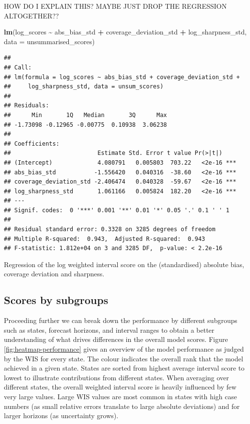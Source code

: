 \documentclass[
]{book}
\newenvironment{Shaded}{\begin{snugshade}}{\end{snugshade}}
\newcommand{\DataTypeTok}[1]{\textcolor[rgb]{0.13,0.29,0.53}{#1}}
\newcommand{\KeywordTok}[1]{\textcolor[rgb]{0.13,0.29,0.53}{\textbf{#1}}}
\newcommand{\NormalTok}[1]{#1}
\newcommand{\OperatorTok}[1]{\textcolor[rgb]{0.81,0.36,0.00}{\textbf{#1}}}
\newcommand{\StringTok}[1]{\textcolor[rgb]{0.31,0.60,0.02}{#1}}
\begin{document}
HOW DO I EXPLAIN THIS? MAYBE JUST DROP THE REGRESSION ALTOGETHER??

\begin{Shaded}
\begin{Highlighting}[]
\KeywordTok{lm}\NormalTok{(log\_scores }\OperatorTok{\textasciitilde{}}\StringTok{ }\NormalTok{abs\_bias\_std }\OperatorTok{+}\StringTok{ }\NormalTok{coverage\_deviation\_std }\OperatorTok{+}\StringTok{ }\NormalTok{log\_sharpness\_std, }
   \DataTypeTok{data =}\NormalTok{ unsummarised\_scores) }
\end{Highlighting}
\end{Shaded}

\begin{verbatim}
## 
## Call:
## lm(formula = log_scores ~ abs_bias_std + coverage_deviation_std + 
##     log_sharpness_std, data = unsum_scores)
## 
## Residuals:
##      Min       1Q   Median       3Q      Max 
## -1.73098 -0.12965 -0.00775  0.10938  3.06238 
## 
## Coefficients:
##                         Estimate Std. Error t value Pr(>|t|)    
## (Intercept)             4.080791   0.005803  703.22   <2e-16 ***
## abs_bias_std           -1.556420   0.040316  -38.60   <2e-16 ***
## coverage_deviation_std -2.406474   0.040328  -59.67   <2e-16 ***
## log_sharpness_std       1.061166   0.005824  182.20   <2e-16 ***
## ---
## Signif. codes:  0 '***' 0.001 '**' 0.01 '*' 0.05 '.' 0.1 ' ' 1
## 
## Residual standard error: 0.3328 on 3285 degrees of freedom
## Multiple R-squared:  0.943,	Adjusted R-squared:  0.943 
## F-statistic: 1.812e+04 on 3 and 3285 DF,  p-value: < 2.2e-16
\end{verbatim}

\label{tab:regression-wis-metrics}Regression of the log weighted interval score on the (standardised) absolute bias, coverage deviation and sharpness.

\hypertarget{scores-by-subgroups}{%
\subsection{Scores by subgroups}\label{scores-by-subgroups}}

Proceeding further we can break down the performance by different subgroups such as states, forecast horizons, and interval ranges to obtain a better understanding of what drives differences in the overall model scores. Figure \ref{fig:heatmap-performance} gives an overview of the model performance as judged by the WIS for every state. The colour indicates the overall rank that the model achieved in a given state. States are sorted from highest average interval score to lowest to illustrate contributions from different states. When averaging over different states, the overall weighted interval score is heavily influenced by few very large values. Large WIS values are most common in states with high case numbers (as small relative errors translate to large absolute deviations) and for larger horizons (as uncertainty grows).
\end{document}
